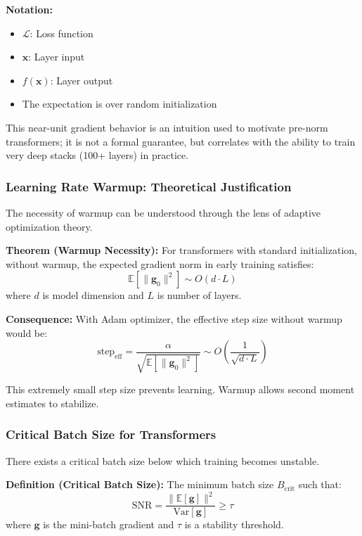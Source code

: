 \documentclass[11pt]{article}
\begin{document}
\begin{notationbox}
\textbf{Notation:}
\begin{itemize}
    \item $\mathcal{L}$: Loss function
    \item $\mathbf{x}$: Layer input
    \item $f(\mathbf{x})$: Layer output
    \item The expectation is over random initialization
\end{itemize}
\end{notationbox}

This near-unit gradient behavior is an intuition used to motivate pre-norm transformers; it is not a formal guarantee, but correlates with the ability to train very deep stacks (100+ layers) in practice.

\subsubsection{Learning Rate Warmup: Theoretical Justification}

The necessity of warmup can be understood through the lens of adaptive optimization theory.

\textbf{Theorem (Warmup Necessity):} For transformers with standard initialization, without warmup, the expected gradient norm in early training satisfies:
\begin{equation}
\mathbb{E}[\|\mathbf{g}_0\|^2] \sim O(d \cdot L)
\end{equation}
where $d$ is model dimension and $L$ is number of layers.

\textbf{Consequence:} With Adam optimizer, the effective step size without warmup would be:
\begin{equation}
\text{step}_{\text{eff}} = \frac{\alpha}{\sqrt{\mathbb{E}[\|\mathbf{g}_0\|^2]}} \sim O\left(\frac{1}{\sqrt{d \cdot L}}\right)
\end{equation}

This extremely small step size prevents learning. Warmup allows second moment estimates to stabilize.

\subsubsection{Critical Batch Size for Transformers}

There exists a critical batch size below which training becomes unstable.

\textbf{Definition (Critical Batch Size):} The minimum batch size $B_{\text{crit}}$ such that:
\begin{equation}
\text{SNR} = \frac{\|\mathbb{E}[\mathbf{g}]\|^2}{\text{Var}[\mathbf{g}]} \geq \tau
\end{equation}
where $\mathbf{g}$ is the mini-batch gradient and $\tau$ is a stability threshold.
\end{document}
